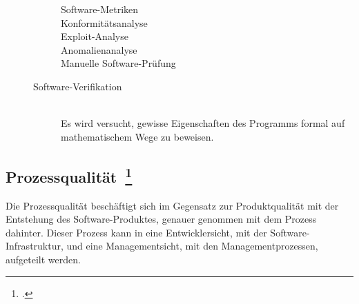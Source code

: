\begin{description}
\begin{description}
\begin{description}
      \item[Software-Metriken] \hfill 
      \item[Konformitätsanalyse] \hfill 
      \item[Exploit-Analyse] \hfill 
      \item[Anomalienanalyse] \hfill 
      \item[Manuelle Software-Prüfung] \hfill 
    \end{description}
    \item[Software-Verifikation] \hfill \\ Es wird versucht, gewisse Eigenschaften des Programms formal auf mathematischem Wege zu beweisen.
  \end{description}
\end{description}

\clearpage
\subsection[Prozessqualität]{Prozessqualität~\footcite[vgl.][Kapitel 1.4.2]{hoffmann_software_qualitat_2013}}

Die Prozessqualität beschäftigt sich im Gegensatz zur Produktqualität mit der Entstehung des Software-Produktes, genauer genommen mit dem Prozess dahinter.
Dieser Prozess kann in eine Entwicklersicht, mit der Software-Infrastruktur, und eine Managementsicht, mit den Managementprozessen, aufgeteilt werden.

